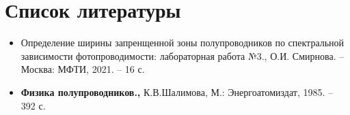 \documentclass[a4paper, 12pt]{article}
\begin{document}
\section{Список литературы}
\begin{itemize}
    \item Определение ширины запренщенной зоны полупроводников по спектральной зависимости фотопроводимости: лабораторная работа №3., О.И. Смирнова. -- Москва: МФТИ, 2021. -- 16 с.
    \item \textbf{Физика полупроводников.,} К.В.Шалимова, М.: Энергоатомиздат, 1985. -- 392 с.
\end{itemize}
\end{document}
